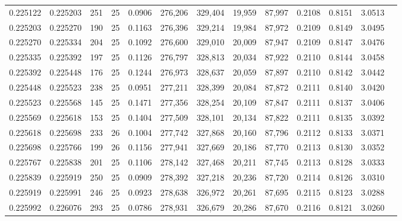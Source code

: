 \begin{tabular}{rrrrrrrrrrrrr}
0.225122 & 0.225203 &   251 &  25 &                                     0.0906 & 276,206 & 329,404 &  19,959 &  87,997 & 0.2108 & 0.8151 & 3.0513 \\
0.225203 & 0.225270 &   190 &  25 &                                     0.1163 & 276,396 & 329,214 &  19,984 &  87,972 & 0.2109 & 0.8149 & 3.0495 \\
0.225270 & 0.225334 &   204 &  25 &                                     0.1092 & 276,600 & 329,010 &  20,009 &  87,947 & 0.2109 & 0.8147 & 3.0476 \\
0.225335 & 0.225392 &   197 &  25 &                                     0.1126 & 276,797 & 328,813 &  20,034 &  87,922 & 0.2110 & 0.8144 & 3.0458 \\
0.225392 & 0.225448 &   176 &  25 &                                     0.1244 & 276,973 & 328,637 &  20,059 &  87,897 & 0.2110 & 0.8142 & 3.0442 \\
0.225448 & 0.225523 &   238 &  25 &                                     0.0951 & 277,211 & 328,399 &  20,084 &  87,872 & 0.2111 & 0.8140 & 3.0420 \\
0.225523 & 0.225568 &   145 &  25 &                                     0.1471 & 277,356 & 328,254 &  20,109 &  87,847 & 0.2111 & 0.8137 & 3.0406 \\
0.225569 & 0.225618 &   153 &  25 &                                     0.1404 & 277,509 & 328,101 &  20,134 &  87,822 & 0.2111 & 0.8135 & 3.0392 \\
0.225618 & 0.225698 &   233 &  26 &                                     0.1004 & 277,742 & 327,868 &  20,160 &  87,796 & 0.2112 & 0.8133 & 3.0371 \\
0.225698 & 0.225766 &   199 &  26 &                                     0.1156 & 277,941 & 327,669 &  20,186 &  87,770 & 0.2113 & 0.8130 & 3.0352 \\
0.225767 & 0.225838 &   201 &  25 &                                     0.1106 & 278,142 & 327,468 &  20,211 &  87,745 & 0.2113 & 0.8128 & 3.0333 \\
0.225839 & 0.225919 &   250 &  25 &                                     0.0909 & 278,392 & 327,218 &  20,236 &  87,720 & 0.2114 & 0.8126 & 3.0310 \\
0.225919 & 0.225991 &   246 &  25 &                                     0.0923 & 278,638 & 326,972 &  20,261 &  87,695 & 0.2115 & 0.8123 & 3.0288 \\
0.225992 & 0.226076 &   293 &  25 &                                     0.0786 & 278,931 & 326,679 &  20,286 &  87,670 & 0.2116 & 0.8121 & 3.0260 \\

\end{tabular}
